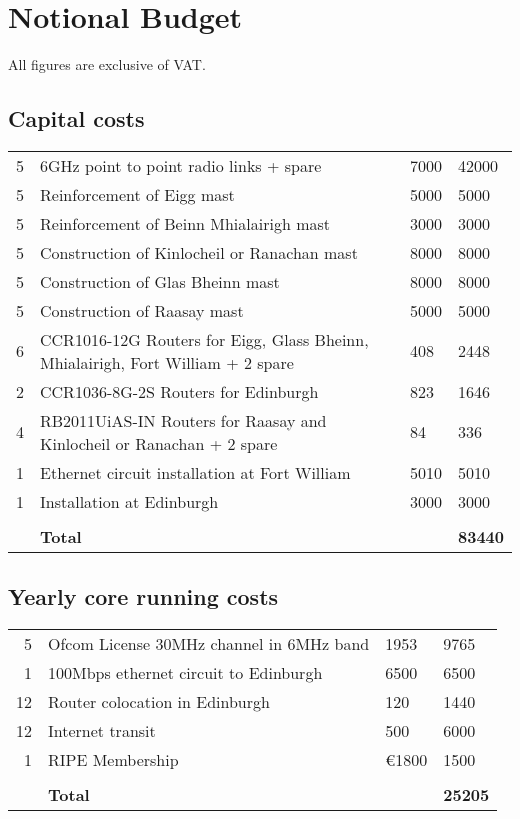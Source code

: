 \section{Notional Budget}

All figures are exclusive of VAT.

\subsection{Capital costs}

\begin{tabular}{rp{}p{}p{}}
  5 & 6GHz point to point radio links + spare & 7000 & 42000\\
  5 & Reinforcement of Eigg mast & 5000 & 5000\\
  5 & Reinforcement of Beinn Mhialairigh mast & 3000 & 3000\\
  5 & Construction of Kinlocheil or Ranachan mast & 8000 & 8000\\
  5 & Construction of Glas Bheinn mast & 8000 & 8000\\
  5 & Construction of Raasay mast & 5000 & 5000\\
  6 & CCR1016-12G Routers for Eigg, Glass Bheinn, Mhialairigh, Fort
      William + 2 spare & 408 & 2448 \\
  2 & CCR1036-8G-2S Routers for Edinburgh & 823 & 1646\\
  4 & RB2011UiAS-IN Routers for Raasay and Kinlocheil or Ranachan +
      2 spare & 84 & 336\\
  1 & Ethernet circuit installation at Fort William & 5010 & 5010\\
  1 & Installation at Edinburgh & 3000 & 3000 \\
  \hline\\
    & \textbf{Total} & & \textbf{83440}\\
\end{tabular}

\subsection{Yearly core running costs}

\begin{tabular}{rp{}p{}p{}}
  5 & Ofcom License 30MHz channel in 6MHz band & 1953 & 9765 \\
  1 & 100Mbps ethernet circuit to Edinburgh & 6500 & 6500\\
  12 & Router colocation in Edinburgh & 120 & 1440\\
  12 & Internet transit & 500 & 6000\\
  1 & RIPE Membership & \euro 1800 & 1500\\
  \hline\\
  & \textbf{Total} & & \textbf{25205}\\
\end{tabular}
